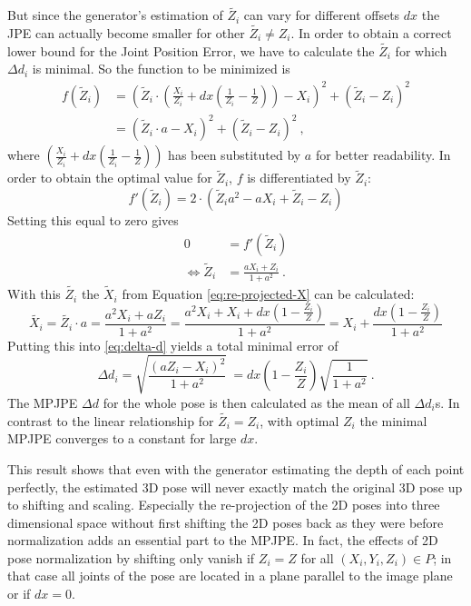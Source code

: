 But since the generator's estimation of $\widetilde{Z_i}$ can vary for different offsets $dx$ the JPE can actually become smaller for other $\widetilde{Z_i} \neq Z_i$. 
In order to obtain a correct lower bound for the Joint Position Error, we have to calculate the $\widetilde{Z_i}$ for which $\Delta d_i$ is minimal.
So the function to be minimized is
\begin{align}
	\label{eq:minimum-distance}
	f(\widetilde{Z}_i) &= \left ( \widetilde{Z}_i \cdot \left( \frac{X_i}{Z_i} + dx \left( \frac{1}{Z_i} - \frac{1}{Z} \right) \right ) - X_i \right)^2 + ( \widetilde{Z}_i - Z_i ) ^2 \\
	&= \left ( \widetilde{Z}_i \cdot a - X_i \right)^2 + ( \widetilde{Z}_i - Z_i )^2 \ ,
\end{align}
where $\left( \frac{X_i}{Z_i} + dx \left( \frac{1}{Z_i} - \frac{1}{Z} \right) \right )$ has been substituted by $a$ for better readability.
In order to obtain the optimal value for $\widetilde{Z}_i$, $f$ is differentiated by $\widetilde{Z}_i$:
\begin{equation}
	f'(\widetilde{Z}_i) = 2 \cdot (\widetilde{Z}_i a^2 - a X_i + \widetilde{Z}_i - Z_i)
\end{equation}
Setting this equal to zero gives
\begin{align}
	0 &= f'(\widetilde{Z}_i) \\
	\Leftrightarrow \widetilde{Z}_i & = \frac{a X_i + Z_i}{1 + a^2} \ .
	\label{eq:z_i-min}
\end{align}
With this $\widetilde{Z_i}$ the $\widetilde{X}_i$ from Equation \eqref{eq:re-projected-X} can be calculated:
\begin{equation}
	\widetilde{X_i} 
	= \widetilde{Z_i} \cdot a
	=  \frac{a^2 X_i + a Z_i}{1 + a^2} = \frac{a^2 X_i + X_i + dx \left (1 - \frac{Z_i}{Z} \right )}{1 + a^2}
	= X_i + \frac{dx \left (1 - \frac{Z_i}{Z}\right )}{1 + a^2}
\end{equation}
Putting this into \eqref{eq:delta-d} yields a total minimal error of 
\begin{equation}
	\label{eq:minimum-delta-d}
	\Delta d_i = \sqrt{\frac{(a Z_i - X_i)^2}{1 + a^2}}\
	= dx \left (1 -  \frac{Z_i}{Z} \right ) \sqrt{\frac{1}{1 + a^2}} \ .
\end{equation}
The MPJPE $\Delta d$ for the whole pose is then calculated as the mean of all $\Delta d_i$s.
In contrast to the linear relationship for $\widetilde{Z_i} = Z_i$, with optimal $Z_i$ the minimal MPJPE converges to a constant for large $dx$.

This result shows that even with the generator estimating the depth of each point perfectly, the estimated 3D pose will never exactly match the original 3D pose up to shifting and scaling.
Especially the re-projection of the 2D poses into three dimensional space without first shifting the 2D poses back as they were before normalization adds an essential part to the MPJPE.
In fact, the effects of 2D pose normalization by shifting only vanish if $Z_i = Z$ for all $(X_i, Y_i, Z_i) \in P$; in that case all joints of the pose are located in a plane parallel to the image plane or if $dx = 0$.


